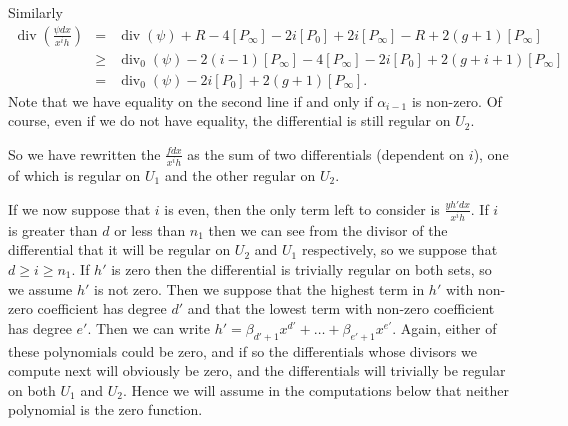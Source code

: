 \documentclass[draft, 11pt]{article} %
\theoremstyle{plain}
\theoremstyle{remark}
\DeclareMathOperator{\di}{div}
\begin{document}
Similarly 
\begin{eqnarray*}
\di\left( \frac{\psi dx}{x^ih} \right) & = & \di(\psi) + R - 4[P_\infty] - 2i[P_0] + 2i[P_\infty] - R + 2(g+1)[P_\infty] \\
& \geq & \di_0(\psi ) - 2(i-1)[P_\infty] - 4[P_\infty] - 2i[P_0] + 2(g+i + 1)[P_\infty] \\
& = & \di_0(\psi) - 2i[P_0] + 2(g+1)[P_\infty].
\end{eqnarray*}
Note that we have equality on the second line if and only if $\alpha_{i-1}$ is non-zero.
Of course, even if we do not have equality, the differential is still regular on $U_2$.



So we have rewritten the $\frac{fdx}{x^ih}$ as the sum of two differentials (dependent on $i$), one of which is regular on $U_1$ and the other regular on $U_2$.



If we now suppose that $i$ is even, then the only term left to consider is
$\frac{yh'dx}{x^ih}$.
If $i$ is greater than $d$ or less than $n_1$ then we can see from the divisor of the differential that it will be regular on $U_2$ and $U_1$ respectively, so we suppose that $d \geq i \geq n_1$.
If $h'$ is zero then the differential is trivially regular on both sets, so we assume $h'$ is not zero.
Then we suppose that the highest term in $h'$ with non-zero coefficient has degree $d'$ and that the lowest term with non-zero coefficient has degree $e'$.
Then we can write $h' = \beta_{d'+1} x^{d'} + \ldots + \beta_{e'+1} x^{e'}$.
Again, either of these polynomials could be zero, and if so the differentials whose divisors we compute next will obviously be zero, and the differentials will trivially be regular on both $U_1$ and $U_2$.
Hence we will assume in the computations below that neither polynomial is the zero function.
\end{document}
